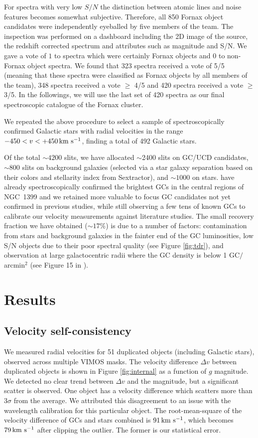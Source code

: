 \documentclass[useAMS,usenatbib]{mn2e}
\newcommand{\kms}{\mbox{\,km~s$^{-1}$}}
\begin{document}
For spectra with very low $S/N$ the distinction between atomic lines and noise 
features becomes somewhat subjective. Therefore, all 850 Fornax object 
candidates were independently eyeballed by five members of the team. The 
inspection was performed on a dashboard including the 2D image of the source, 
the redshift corrected spectrum and attributes such as magnitude and S/N. We 
gave a vote of $1$ to spectra which were certainly Fornax objects and $0$ to 
non-Fornax object spectra. We found that 323 spectra received a vote of 5/5 
(meaning that these spectra were classified as Fornax objects by all members of 
the team), 348 spectra received a vote $\ge$ 4/5 and 420 spectra received a vote 
$\ge$ 3/5. In the followings, we will use the last set of 420 spectra as our 
final spectroscopic catalogue of the Fornax cluster. 

We repeated the above procedure to select a sample of spectroscopically 
confirmed Galactic stars with radial velocities in the range $-450<v<+450 
\kms$, finding a total of 492 Galactic stars.

Of the total $\sim4200$ slits, we have allocated $\sim$2400 slits on GC/UCD candidates, 
$\sim 800$ slits on background galaxies (selected via a star galaxy separation 
based on their colors and stellarity index from Sextractor), and $\sim1000$ 
on stars. \citet{Schuberth} have already spectroscopically confirmed the brightest GCs
in the central regions of NGC~1399 and we retained more valuable to focus GC candidates 
not yet confirmed in previous studies, while still observing a few tens of known GCs to calibrate 
our velocity measurements against literature studies. The small recovery fraction we have 
obtained ($\sim 17\%$) is due to a number of factors: contamination
from stars and background galaxies in the fainter end of the GC 
luminosities, low S/N objects due to their poor spectral quality (see Figure \ref{fig:tdr}),
and observation at large galactocentric radii where the GC density is 
below 1 GC$/$ arcmin$^2$ (see Figure 15 in \citealt{Schuberth} ). 

\section{Results}
\label{sec:analysis}
\subsection{Velocity self-consistency}

We measured radial velocities for 51 duplicated objects (including Galactic 
stars), observed across multiple VIMOS masks. The velocity difference $\Delta 
v$ between duplicated objects is shown in Figure \ref{fig:internal} as a 
function of $g$ magnitude. We detected no clear trend between $\Delta v$ and 
the magnitude, but a significant scatter is observed. One object has a velocity 
difference which scatters more than 
3$\sigma$ from the average. We attributed this disagreement to an issue with 
the wavelength calibration for this particular object. The root-mean-square of 
the velocity difference of GCs and stars combined is $91 \kms$, which becomes 
$79\kms$ after clipping the outlier. The former is our statistical error.
\end{document}
